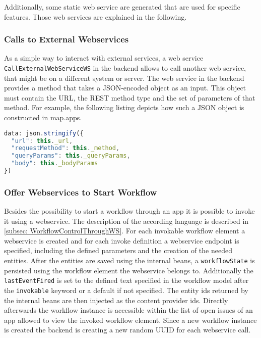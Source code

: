 Additionally, some static web service are generated that are used for specific features. Those web services are explained in the following.
\subsubsection{Calls to External Webservices}
As a simple way to interact with external services, a web service \lstinline|CallExternalWebServiceWS| in the backend allows to call another web service, that might be on a different system or server. The web service in the backend provides a method that takes a JSON-encoded object as an input. This object must contain the URL, the REST method type and the set of parameters of that method. For example, the following listing depicts how such a JSON object is constructed in map.apps.

\begin{lstlisting}[language=Javascript, label=lst:callExtWSJSON, caption=JSON-encoded object containing information to call an external web service]
data: json.stringify({
  "url": this._url,
  "requestMethod": this._method,
  "queryParams": this._queryParams,
  "body": this._bodyParams
})
\end{lstlisting}

\subsubsection{Offer Webservices to Start Workflow}
Besides the possibility to start a workflow through an app it is possible to invoke it using a webservice. The description of the according language is described in \cref{subsec: WorkflowControlThroughWS}. For each invokable workflow element a webservice is created and for each invoke definition a webservice endpoint is specified, including the defined parameters and the creation of the needed entities. After the entities are saved using the internal beans, a \lstinline|workflowState| is persisted using the workflow element the webservice belongs to. Additionally the \lstinline|lastEventFired| is set to the defined text specified in the workflow model after the \lstinline[language=MD2]|invokable| keyword or a default if not specified. The entity ids returned by the internal beans are then injected as the content provider ids. Directly afterwards the workflow instance is accessible within the list of open issues of an app allowed to view the invoked workflow element. Since a new workflow instance is created the backend is creating a new random UUID for each webservice call.

